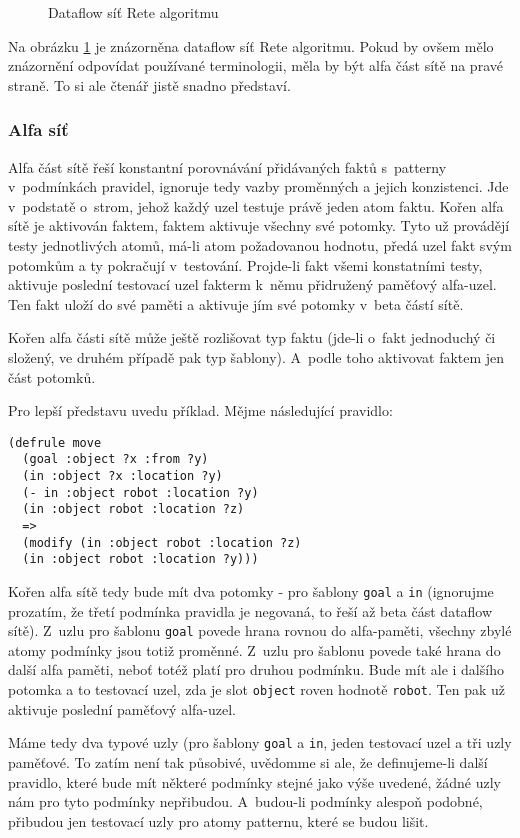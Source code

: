 \begin{figure}[h]
\centerline{}
\caption{Dataflow síť Rete algoritmu\cite{rete}}
\label{network}
\end{figure}

Na obrázku \ref{network} je znázorněna dataflow síť Rete algoritmu.
Pokud by ovšem mělo znázornění odpovídat používané terminologii, měla
by být alfa část sítě na pravé straně. To si ale čtenář jistě snadno
představí.

\subsubsection{Alfa síť}
Alfa část sítě řeší konstantní porovnávání přidávaných faktů s~patterny
v~podmínkách pravidel, ignoruje tedy vazby proměnných a jejich konzistenci.
Jde v~podstatě o~strom, jehož každý uzel testuje právě jeden atom faktu.
Kořen alfa sítě je aktivován faktem, faktem aktivuje všechny své potomky.
Tyto už provádějí testy jednotlivých atomů, má-li atom požadovanou hodnotu,
předá uzel fakt svým potomkům a ty pokračují v~testování. Projde-li fakt
všemi konstatními testy, aktivuje poslední testovací uzel fakterm k~němu
přidružený paměťový alfa-uzel. Ten fakt uloží do své paměti a aktivuje
jím své potomky v~beta částí sítě.

Kořen alfa části sítě může ještě rozlišovat typ faktu (jde-li o~fakt
jednoduchý či složený, ve druhém případě pak typ šablony). A~podle toho
aktivovat faktem jen část potomků.

Pro lepší představu uvedu příklad. Mějme následující pravidlo:
\begin{verbatim}
(defrule move
  (goal :object ?x :from ?y)
  (in :object ?x :location ?y)
  (- in :object robot :location ?y)
  (in :object robot :location ?z)
  =>
  (modify (in :object robot :location ?z)
  (in :object robot :location ?y)))
\end{verbatim}
Kořen alfa sítě tedy bude mít dva potomky - pro šablony \verb|goal|
a \verb|in| (ignorujme prozatím, že třetí podmínka pravidla je negovaná,
to řeší až beta část dataflow sítě). Z~uzlu pro šablonu \verb|goal|
povede hrana rovnou do alfa-paměti, všechny zbylé atomy podmínky jsou
totiž proměnné. Z~uzlu pro šablonu povede také hrana do další alfa
paměti, neboť totéž platí pro druhou podmínku. Bude mít ale i dalšího
potomka a to testovací uzel, zda je slot \verb|object| roven hodnotě
\verb|robot|. Ten pak už aktivuje poslední paměťový alfa-uzel.

Máme tedy dva typové uzly (pro šablony \verb|goal| a \verb|in|, jeden
testovací uzel a tři uzly paměťové. To zatím není tak působivé,
uvědomme si ale, že definujeme-li další pravidlo, které bude mít
některé podmínky stejné jako výše uvedené, žádné uzly nám pro tyto
podmínky nepřibudou. A~budou-li podmínky alespoň podobné, přibudou
jen testovací uzly pro atomy patternu, které se budou lišit.

